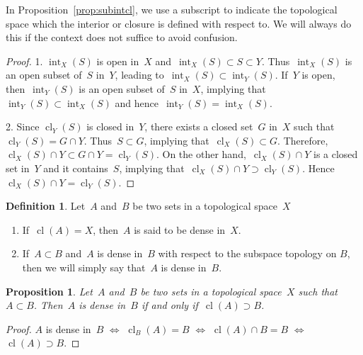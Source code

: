 \documentclass[11pt,a4paper]{article}
\newtheorem{proposition}{Proposition}[section]
\theoremstyle{definition}
\newtheorem{definition}{Definition}[section]
\DeclareMathOperator{\inter}{int}
\DeclareMathOperator{\cl}{cl}
\numberwithin{equation}{section}
\begin{document}
In Proposition~\ref{prop:subintcl}, we use a subscript to indicate the topological space which the
interior or closure is defined with respect to. We will always do this if the context does not
suffice to avoid confusion. 

\begin{proof}
  1. $\inter_X(S)$ is open in~$X$ and~$\inter_X(S)\subset S\subset Y$. Thus~$\inter_X(S)$ is an open
     subset of~$S$ in~$Y$, leading to~$\inter_X(S)\subset \inter_Y(S)$. If~$Y$ is open,
     then~$\inter_Y(S)$ is an open subset of~$S$ in~$X$, implying that~$\inter_Y(S)\subset
     \inter_X(S)$ and hence~$\inter_Y(S) = \inter_X(S)$. 

  2. %
     Since $\cl_Y(S)$ is closed in~$Y$, there exists a closed set~$G$ in~$X$ such
     that~$\cl_Y(S)= G\cap Y$. Thus~$S\subset  G$, implying that~$\cl_X(S) \subset G$.
     Therefore,~$\cl_X(S)\cap Y \subset G\cap Y = \cl_Y(S)$.  On the other hand,~$\cl_X(S)\cap Y$ is
     a closed set in~$Y$ and it contains~$S$, implying that~$\cl_X(S)\cap Y \supset \cl_Y(S)$.
     Hence~$\cl_X(S)\cap Y = \cl_Y(S)$.
\end{proof}

\begin{definition}
  \label{def:dense}
  Let~$A$ and~$B$ be two sets in a topological space~$X$
  \begin{enumerate}
    \item If~$\cl(A) = X$, then~$A$ is said to be dense in~$X$. 
    \item If~$A\subset B$ and~$A$ is dense in~$B$ with respect to the subspace topology on $B$, 
    then we will simply say that~$A$ is dense in~$B$.  
  \end{enumerate}
\end{definition}

\begin{proposition}
  \label{prop:densein}
  Let~$A$ and~$B$ be two sets in a topological space~$X$ such that~$A\subset B$. Then~$A$ is dense
  in~$B$ if and only if~$\cl(A) \supset B$.
\end{proposition}

\begin{proof}
  $A$ is dense in~$B$ $\Leftrightarrow $ $\cl_B(A) = B$ $\Leftrightarrow$ $\cl(A)\cap B = B$
  $\Leftrightarrow$ $\cl(A) \supset B$. 
\end{proof}
\end{document}
